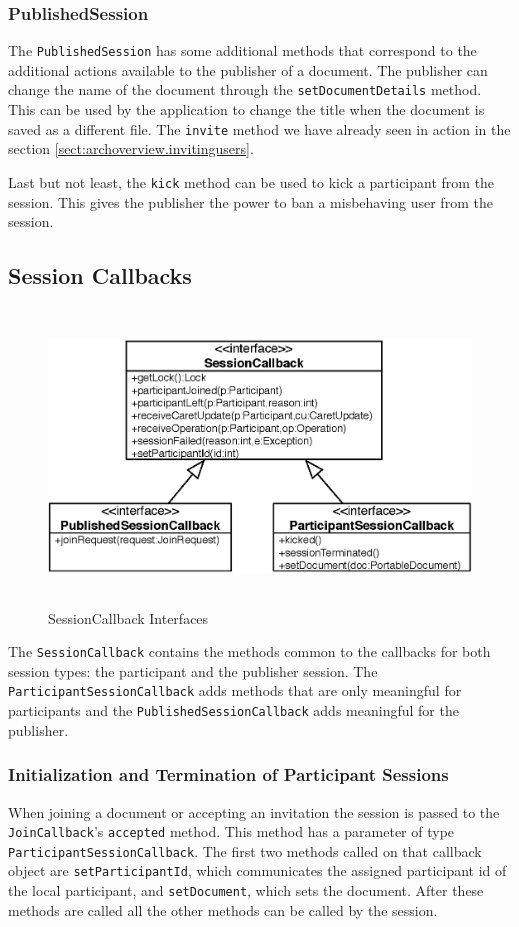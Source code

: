 \subsubsection{PublishedSession}
The \texttt{Published\-Session} has some additional methods that correspond
to the additional actions available to the publisher of a document. The
publisher can change the name of the document through the
\texttt{set\-Document\-Details} method. This can be used by the application
to change the title when the document is saved as a different file.
The \texttt{invite} method we have already seen in action in the section
\ref{sect:archoverview.invitingusers}.

Last but not least, the \texttt{kick} method can be used to kick a
participant from the session. This gives the publisher the power to
ban a misbehaving user from the session.


\subsection{Session Callbacks}
\begin{figure}[H]
 \centering
 \includegraphics[width=14.25cm,height=7.83cm]{../images/finalreport/architecture_sessioncallback_uml.eps}
 \caption{SessionCallback Interfaces}
 \label{fig:archoverview.sessioncallback}
\end{figure}

The \texttt{Session\-Callback} contains the methods common to the callbacks for 
both session types: the participant and the publisher session. The 
\texttt{Participant\-Session\-Callback} adds methods that are only meaningful 
for participants and the \texttt{Published\-Session\-Callback} adds meaningful
for the publisher.


\subsubsection{Initialization and Termination of Participant Sessions}
When joining a document or accepting an invitation the session is passed to
the \texttt{Join\-Callback}'s \texttt{accepted} method. This method has a
parameter of type \texttt{Participant\-Session\-Callback}. The first two
methods called on that callback object are \texttt{set\-Participant\-Id}, which 
communicates the assigned participant id of the local participant, and 
\texttt{set\-Document}, which sets the document. After these methods are called
all the other methods can be called by the session.

